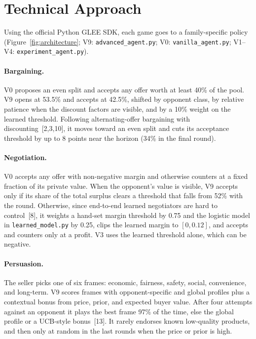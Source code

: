 \documentclass{article}
\begin{document}
\section{Technical Approach}

Using the official Python GLEE SDK, each game goes to a family-specific policy (Figure~\ref{fig:architecture}; V9: \texttt{advanced\_agent.py}; V0: \texttt{vanilla\_agent.py}; V1--V4: \texttt{experiment\_agent.py}).

\paragraph{Bargaining.}
V0 proposes an even split and accepts any offer worth at least 40\% of the pool. V9 opens at 53.5\% and accepts at 42.5\%, shifted by opponent class, by relative patience when the discount factors are visible, and by a 10\% weight on the learned threshold. Following alternating-offer bargaining with discounting~[2,3,10], it moves toward an even split and cuts its acceptance threshold by up to 8 points near the horizon (34\% in the final round).

\paragraph{Negotiation.}
V0 accepts any offer with non-negative margin and otherwise counters at a fixed fraction of its private value. When the opponent's value is visible, V9 accepts only if its share of the total surplus clears a threshold that falls from 52\% with the round. Otherwise, since end-to-end learned negotiators are hard to control~[8], it weights a hand-set margin threshold by 0.75 and the logistic model in \texttt{learned\_model.py} by 0.25, clips the learned margin to $[0, 0.12]$, and accepts and counters only at a profit. V3 uses the learned threshold alone, which can be negative.

\paragraph{Persuasion.}
The seller picks one of six frames: economic, fairness, safety, social, convenience, and long-term. V9 scores frames with opponent-specific and global profiles plus a contextual bonus from price, prior, and expected buyer value. After four attempts against an opponent it plays the best frame 97\% of the time, else the global profile or a UCB-style bonus~[13]. It rarely endorses known low-quality products, and then only at random in the last rounds when the price or prior is high.
\end{document}
